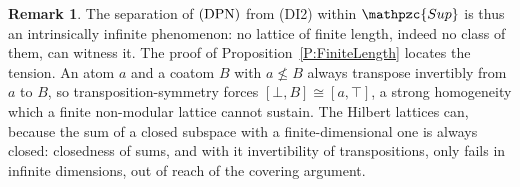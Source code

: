 \documentclass[reqno,a4paper]{amsart}
\numberwithin{equation}{section}
\theoremstyle{plain}
\theoremstyle{definition}
\newtheorem{remark}[subsection]{Remark}
\def\nameit#1{\textrm{#1}~}
\def\prox{\nameit{Proposition}}
\newcommand{\iso}{\cong}
\newcommand{\catfont}[1]{\ensuremath{\mathpzc{#1}}\xspace}
\newcommand{\Sup}{\catfont{Sup}}
\renewcommand{\1}{\onecat{1}}
\newcommand{\DPN}{\textup{(DPN)}}
\begin{document}
\begin{remark}\label{Rem NSD Infinite}
	The separation of \(\DPN\) from \textup{(DI2)} within \(\Sup\) is thus an intrinsically infinite phenomenon: no lattice of finite length, indeed no class of them, can witness it. The proof of \prox\ref{P:FiniteLength} locates the tension. An atom \(a\) and a coatom \(B\) with \(a\not\leq B\) always transpose invertibly from \(a\) to \(B\), so transposition-symmetry forces \([\bot,B]\iso[a,\top]\), a strong homogeneity which a finite non-modular lattice cannot sustain. The Hilbert lattices can, because the sum of a closed subspace with a finite-dimensional one is always closed: closedness of sums, and with it invertibility of transpositions, only fails in infinite dimensions, out of reach of the covering argument.
\end{remark}



\end{document}
